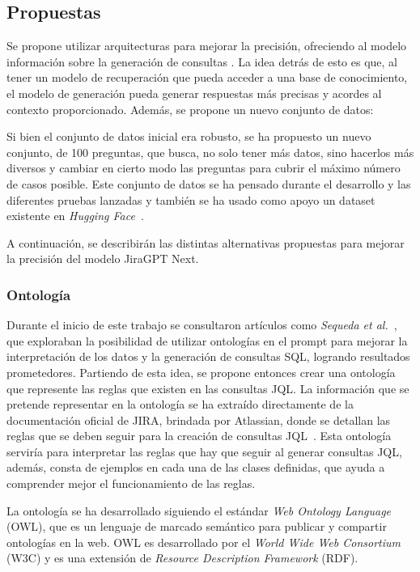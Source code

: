 \subsection{Propuestas}
Se propone utilizar arquitecturas  para mejorar la precisión, ofreciendo al modelo información sobre la generación de consultas . La idea detrás de esto es que, al tener un modelo de recuperación que pueda acceder a una base de conocimiento, el modelo de generación pueda generar respuestas más precisas y acordes al contexto proporcionado. Además, se propone un nuevo conjunto de datos:

Si bien el conjunto de datos inicial era robusto, se ha propuesto un nuevo conjunto, de 100 preguntas, que busca, no solo tener más datos, sino hacerlos más diversos y cambiar en cierto modo las preguntas para cubrir el máximo número de casos posible. Este conjunto de datos se ha pensado durante el desarrollo y las diferentes pruebas lanzadas y también se ha usado como apoyo un dataset existente en \textit{Hugging Face}~\cite{datasetHF}.

A continuación, se describirán las distintas alternativas propuestas para mejorar la precisión del modelo JiraGPT Next.

\subsubsection{Ontología}
Durante el inicio de este trabajo se consultaron artículos como \textit{Sequeda et al.}~\cite{sequeda2023benchmark}, que exploraban la posibilidad de utilizar ontologías en el prompt para mejorar la interpretación de los datos y la generación de consultas SQL, logrando resultados prometedores. Partiendo de esta idea, se propone entonces crear una ontología que represente las reglas que existen en las consultas JQL. La información que se pretende representar en la ontología se ha extraído directamente de la documentación oficial de JIRA, brindada por Atlassian, donde se detallan las reglas que se deben seguir para la creación de consultas JQL~\cite{jiradocs}. Esta ontología serviría para interpretar las reglas que hay que seguir al generar consultas JQL, además, consta de ejemplos en cada una de las clases definidas, que ayuda a comprender mejor el funcionamiento de las reglas.

La ontología se ha desarrollado siguiendo el estándar \textit{Web Ontology Language} (OWL), que es un lenguaje de marcado semántico para publicar y compartir ontologías en la web. OWL es desarrollado por el \textit{World Wide Web Consortium} (W3C) y es una extensión de \textit{Resource Description Framework} (RDF).

